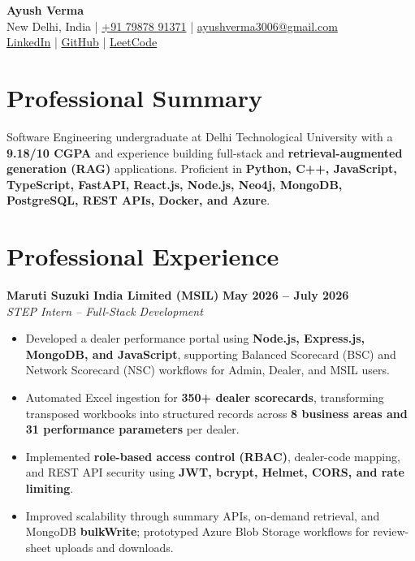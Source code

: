 \documentclass[a4paper,10pt]{article}
\newcommand{\resumeHeading}[4]{
  \textbf{#1} \hfill \textbf{#2}\\
  \textit{#3} \hfill \textit{#4}\\[-3pt]
}
\begin{document}

\begin{center}
  {\LARGE \textbf{Ayush Verma}}\\[4pt]

  New Delhi, India
  \;|\;
  \href{tel:+917987891371}{+91 79878 91371}
  \;|\;
  \href{mailto:ayushverma3006@gmail.com}
  {ayushverma3006@gmail.com}\\[2pt]

  \href{https://www.linkedin.com/in/ayush-verma-7334a8194/}
  {LinkedIn}
  \;|\;
  \href{https://github.com/ayushsotechy}
  {GitHub}
  \;|\;
  \href{https://leetcode.com/u/ayushsotechy/}
  {LeetCode}
\end{center}

\vspace{-6pt}


\section{Professional Summary}

Software Engineering undergraduate at Delhi Technological University with a
\textbf{9.18/10 CGPA} and experience building full-stack and
\textbf{retrieval-augmented generation (RAG)} applications. Proficient in
\textbf{Python, C++, JavaScript, TypeScript, FastAPI, React.js, Node.js,
Neo4j, MongoDB, PostgreSQL, REST APIs, Docker, and Azure}.


\section{Professional Experience}

\resumeHeading
  {Maruti Suzuki India Limited (MSIL)}
  {May 2026 -- July 2026}
  {STEP Intern -- Full-Stack Development}
  {}

\begin{itemize}
  \item Developed a dealer performance portal using
  \textbf{Node.js, Express.js, MongoDB, and JavaScript}, supporting Balanced
  Scorecard (BSC) and Network Scorecard (NSC) workflows for Admin, Dealer,
  and MSIL users.

  \item Automated Excel ingestion for \textbf{350+ dealer scorecards},
  transforming transposed workbooks into structured records across
  \textbf{8 business areas and 31 performance parameters} per dealer.

  \item Implemented \textbf{role-based access control (RBAC)}, dealer-code
  mapping, and REST API security using \textbf{JWT, bcrypt, Helmet, CORS,
  and rate limiting}.

  \item Improved scalability through summary APIs, on-demand retrieval, and
  MongoDB \textbf{bulkWrite}; prototyped Azure Blob Storage workflows for
  review-sheet uploads and downloads.
\end{itemize}
\end{document}
